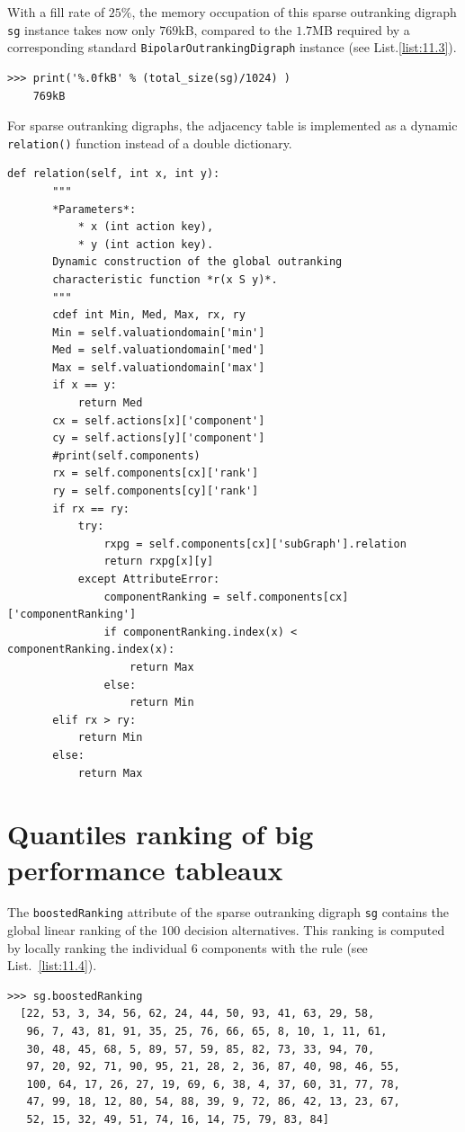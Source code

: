 With a fill rate of $25\%$, the memory occupation of this sparse outranking digraph \texttt{sg} instance takes now only $769$kB, compared to the $1.7$MB required by a corresponding standard \texttt{BipolarOutrankingDigraph} instance (see List.\vref{list:11.3}).
\begin{lstlisting}
>>> print('%.0fkB' % (total_size(sg)/1024) )
    769kB
\end{lstlisting}

For sparse outranking digraphs, the adjacency table is implemented as a dynamic \texttt{relation()} function instead of a double dictionary.
\begin{lstlisting}[caption={The \texttt{relation()} function of a sparse outranking digraph},label=list:11.5,basicstyle=\ttfamily\scriptsize]
   def relation(self, int x, int y):
       """
       *Parameters*:
           * x (int action key),
           * y (int action key).
       Dynamic construction of the global outranking
       characteristic function *r(x S y)*.
       """
       cdef int Min, Med, Max, rx, ry
       Min = self.valuationdomain['min']
       Med = self.valuationdomain['med']
       Max = self.valuationdomain['max']
       if x == y:
           return Med
       cx = self.actions[x]['component']
       cy = self.actions[y]['component']
       #print(self.components)
       rx = self.components[cx]['rank']
       ry = self.components[cy]['rank']
       if rx == ry:
           try:
               rxpg = self.components[cx]['subGraph'].relation
               return rxpg[x][y]
           except AttributeError:
               componentRanking = self.components[cx]['componentRanking']
               if componentRanking.index(x) < componentRanking.index(x):
                   return Max
               else:
                   return Min
       elif rx > ry:
           return Min
       else:
           return Max
\end{lstlisting}

\section{Quantiles ranking of big performance tableaux}
\label{sec:11.5}

The \texttt{boostedRanking} attribute of the sparse outranking digraph \texttt{sg} contains the global linear ranking of the 100 decision alternatives. This ranking is computed by locally ranking the individual 6 components with the \Copeland rule (see List.~\vref{list:11.4}).
\begin{lstlisting}
>>> sg.boostedRanking
  [22, 53, 3, 34, 56, 62, 24, 44, 50, 93, 41, 63, 29, 58,
   96, 7, 43, 81, 91, 35, 25, 76, 66, 65, 8, 10, 1, 11, 61,
   30, 48, 45, 68, 5, 89, 57, 59, 85, 82, 73, 33, 94, 70,
   97, 20, 92, 71, 90, 95, 21, 28, 2, 36, 87, 40, 98, 46, 55,
   100, 64, 17, 26, 27, 19, 69, 6, 38, 4, 37, 60, 31, 77, 78,
   47, 99, 18, 12, 80, 54, 88, 39, 9, 72, 86, 42, 13, 23, 67,
   52, 15, 32, 49, 51, 74, 16, 14, 75, 79, 83, 84]
\end{lstlisting}


